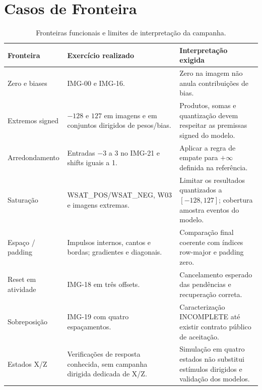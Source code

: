 \section{Casos de Fronteira}
\begin{table}[H]\centering\small
\begin{tabularx}{\textwidth}{>{\raggedright\arraybackslash}p{4.8cm}>{\raggedright\arraybackslash}X>{\raggedright\arraybackslash}p{7.6cm}}\toprule
\textbf{Fronteira} & \textbf{Exercício realizado} & \textbf{Interpretação exigida}\\\midrule
Zero e biases & IMG-00 e IMG-16. & Zero na imagem não anula contribuições de bias.\\
Extremos signed & $-128$ e $127$ em imagens e em conjuntos dirigidos de pesos/bias. & Produtos, somas e quantização devem respeitar as premissas signed do modelo.\\
Arredondamento & Entradas $-3$ a $3$ no IMG-21 e shifts iguais a 1. & Aplicar a regra de empate para $+\infty$ definida na referência.\\
Saturação & WSAT\_POS/WSAT\_NEG, W03 e imagens extremas. & Limitar os resultados quantizados a $[-128,127]$; cobertura amostra eventos do modelo.\\
Espaço / padding & Impulsos internos, cantos e bordas; gradientes e diagonais. & Comparação final coerente com índices row-major e padding zero.\\
Reset em atividade & IMG-18 em três offsets. & Cancelamento esperado das pendências e recuperação correta.\\
Sobreposição & IMG-19 com quatro espaçamentos. & Caracterização INCOMPLETE até existir contrato público de aceitação.\\
Estados X/Z & Verificações de resposta conhecida, sem campanha dirigida dedicada de X/Z. & Simulação em quatro estados não substitui estímulos dirigidos e validação dos modelos.\\\bottomrule
\end{tabularx}
\caption{Fronteiras funcionais e limites de interpretação da campanha.}
\end{table}

